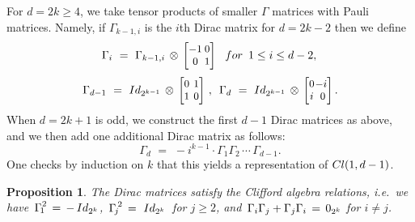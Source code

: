 \documentclass[english]{ourlematema}
\numberwithin{theorem}{section}
\newtheorem{proposition}[theorem]{Proposition}
\theoremstyle{definition}
\begin{document}
For $d =2k \geq 4$, we take tensor products
of smaller $\Gamma$ matrices with  Pauli matrices.
Namely, if $\Gamma_{k-1,i}$ is the $i$th Dirac matrix for $d=2k-2$
then we define
\begin{equation}
\label{eq:Omega2}
  \Gamma_{i} \,\,=\,\, \Gamma_{k-1,i} \,\otimes \,
\begin{small}        \begin{bmatrix}
            -1 \!\! &\!\!\! 0 \\
            0 \!\! &\!\!\! 1
        \end{bmatrix}
\end{small}        \,
        \,\,\,{\rm for}\,\,\, 1\leq i \leq d-2,\,
\end{equation}
\begin{equation}
\label{eq:Omega3}
                 \Gamma_{d-1} \,\,=\,\, {\rm Id}_{2^{k-1}} \,\otimes \,
      \begin{small}  \begin{bmatrix}
            0 \!\! &\!\! 1 \\
            1 \!\! &\!\! 0
        \end{bmatrix} \end{small} \,, \,\,\,
        \Gamma_{d} \,\,= \,\,{\rm Id}_{2^{k-1}} \,\otimes \,
\begin{small}        \begin{bmatrix}
            0 \!\! & \!\! \!\! -i \\
            i \!\! &\!\! 0
        \end{bmatrix}. \end{small}
\end{equation}
When $d = 2k+1$ is odd, we  construct the first $d - 1$ Dirac matrices as above,
 and we then add one additional Dirac matrix as follows:
\begin{equation}
\label{eq:Omega4}
    \Gamma_{d}\,\,=\,\,-i^{k-1} \cdot \Gamma_1 \Gamma_2 \,\cdots\, \Gamma_{d - 1}.
\end{equation}
One checks by induction on $k$ that this yields
a representation of ${\rm Cl}(1,d-1)$.

 \begin{proposition} \label{prop:clifford}
 The Dirac matrices satisfy the Clifford algebra relations, i.e.~we have
$\,{\Gamma_{\! 1}}^{\!\! 2} \,=\, -\,{\rm Id}_{2^k} $, 
$\,{\Gamma_{\! j}}^{\! 2} \,=\, \,{\rm Id}_{2^k}\,$ for $j \geq 2$, and
$\,\Gamma_i \Gamma_j + \Gamma_j \Gamma_i \,=\, {\rm 0}_{2^k}$ for $i \not= j$.
\end{proposition}
\end{document}
